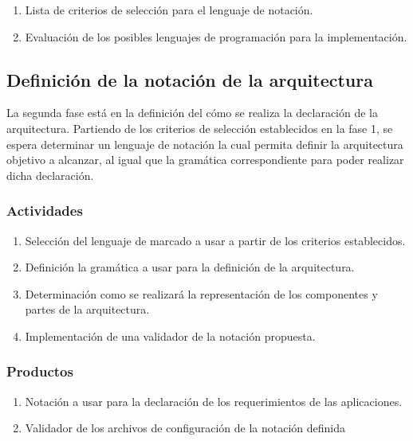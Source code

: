 \begin{enumerate}
    \itemsep-2mm
    \item Lista de criterios de selección para el lenguaje de notación.
    \item Evaluación de los posibles lenguajes de programación para la implementación.
\end{enumerate}

\subsection{Definición de la notación de la arquitectura}

La segunda fase está en la definición del cómo se realiza la declaración de la arquitectura. Partiendo de los criterios de selección establecidos en la fase 1, se espera determinar un lenguaje de notación la cual permita definir la arquitectura objetivo a alcanzar, al igual que la gramática correspondiente para poder realizar dicha declaración. 

\subsubsection*{Actividades}

\begin{enumerate}
    \itemsep-2mm
    \item Selección del lenguaje de marcado a usar a partir de los criterios establecidos.
    \item Definición la gramática a usar para la definición de la arquitectura.
    \item Determinación como se realizará la representación de los componentes y partes de la arquitectura.
    \item Implementación de una validador de la notación propuesta.
\end{enumerate}    

\subsubsection*{Productos}

\begin{enumerate}
    \itemsep-2mm
    \item Notación a usar para la declaración de los requerimientos de las aplicaciones.
    \item Validador de los archivos de configuración de la notación definida
\end{enumerate}

